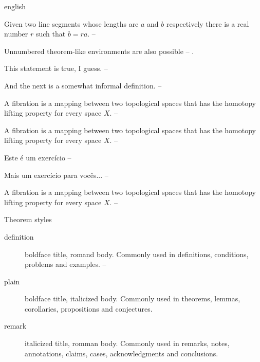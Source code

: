 \begin{otherlanguage*}{english}

    \begin{lema}
        Given two line segments whose lengths are $a$ and $b$ respectively there is a
        real number $r$ such that $b=ra$. -- \showfont
    \end{lema}



    Unnumbered theorem-like environments are also possible -- \showfont.

    \begin{observacao}
        This statement is true, I guess. -- \showfont
    \end{observacao}

    And the next is a somewhat informal definition. -- \showfont


    \begin{definicao}
        A fibration is a mapping between two topological spaces that has the homotopy lifting property for every space $X$. -- \showfont
    \end{definicao}

    \begin{exemplo}
        A fibration is a mapping between two topological spaces that has the homotopy lifting property for every space $X$. -- \showfont
    \end{exemplo}


    \begin{exercicio}
        Este é um exercício -- \showfont

    \end{exercicio}


    \begin{exercicio}
        Mais um exercício para vocês... -- \showfont

    \end{exercicio}


    \begin{condicao}
        A fibration is a mapping between two topological spaces that has the homotopy lifting property for every space $X$. -- \showfont
    \end{condicao}
    Theorem styles

    \begin{description}
        \item[definition] boldface title, romand body. Commonly used in definitions, conditions, problems and examples. -- \showfont
        \item[plain] boldface title, italicized body. Commonly used in theorems, lemmas, corollaries, propositions and conjectures.
        \item[remark] italicized title, romman body. Commonly used in remarks, notes, annotations, claims, cases, acknowledgments and conclusions.
    \end{description}

\end{otherlanguage*}



